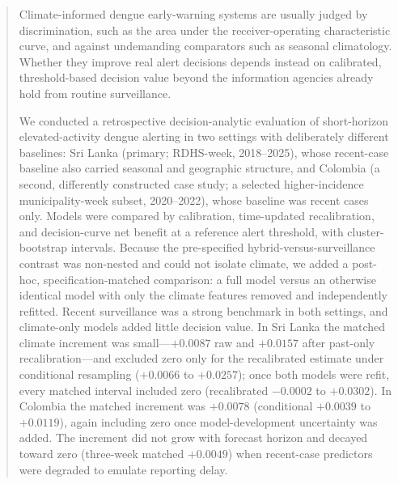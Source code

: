 \documentclass[11pt,a4paper]{article}
\begin{document}
\begin{abstract}
\noindent Climate-informed dengue early-warning systems are usually judged by discrimination, such as the area under the receiver-operating characteristic curve, and against undemanding comparators such as seasonal climatology. Whether they improve real alert decisions depends instead on calibrated, threshold-based decision value beyond the information agencies already hold from routine surveillance.

\noindent We conducted a retrospective decision-analytic evaluation of short-horizon elevated-activity dengue alerting in two settings with deliberately different baselines: Sri Lanka (primary; RDHS-week, 2018--2025), whose recent-case baseline also carried seasonal and geographic structure, and Colombia (a second, differently constructed case study; a selected higher-incidence municipality-week subset, 2020--2022), whose baseline was recent cases only. Models were compared by calibration, time-updated recalibration, and decision-curve net benefit at a reference alert threshold, with cluster-bootstrap intervals. Because the pre-specified hybrid-versus-surveillance contrast was non-nested and could not isolate climate, we added a post-hoc, specification-matched comparison: a full model versus an otherwise identical model with only the climate features removed and independently refitted. Recent surveillance was a strong benchmark in both settings, and climate-only models added little decision value. In Sri Lanka the matched climate increment was small---$+0.0087$ raw and $+0.0157$ after past-only recalibration---and excluded zero only for the recalibrated estimate under conditional resampling ($+0.0066$ to $+0.0257$); once both models were refit, every matched interval included zero (recalibrated $-0.0002$ to $+0.0302$). In Colombia the matched increment was $+0.0078$ (conditional $+0.0039$ to $+0.0119$), again including zero once model-development uncertainty was added. The increment did not grow with forecast horizon and decayed toward zero (three-week matched $+0.0049$) when recent-case predictors were degraded to emulate reporting delay.


\end{abstract}
\end{document}
